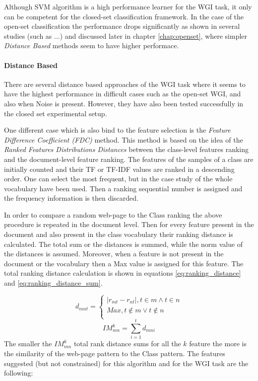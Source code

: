 Although SVM algorithm is a high performance learner for the WGI task, it only can be competent for the closed-set classification framework. In the case of the open-set classification the performance drops significantly as shown in several studies (such as ...) and discussed later in chapter \ref{chap:openset}, where simpler \textit{Distance Based} methods seem to have higher performace.

\paragraph{Distance Based} There are several distance based approaches of the WGI task where it seems to have the highest performance in difficult cases such as the open-set WGI, and also when Noise is present. However, they have also been tested successfully in the closed set experimental setup.

One different case which is also bind to the feature selection is the \textit{Feature Difference Coefficient (FDC)} method. This method is based on the idea of the \textit{Ranked Features Distributions Distances} between the class-level features ranking and the document-level feature ranking. The features of the samples of a class are initially counted and their TF or TF-IDF values are ranked in a descending order. One can select the most frequent, but in the case study of \parencite{waltinger2010feature} the whole vocabulary have been used. Then a ranking sequential number is assigned and the frequency information is then discarded.

In order to compare a random web-page to the Class ranking the above procedure is repeated in the document level. Then for every feature present in the document and also present in the class vocabulary their ranking distance is calculated. The total sum or the distances is summed, while the norm value of the distances is assumed. Moreover, when a feature is not present in the document or the vocabulary then a Max value is assigned for this feature. The total ranking distance calculation is shown in equations \ref{eq:ranking_distance} and \ref{eq:ranking_distance_sum}.

\begin{equation}\label{eq:ranking_distance}
	d_{mnt} =
      \begin{cases}
      	| r_{mt} - r_{nt} |, t \in m \wedge t \in n  \\
        Max, t \notin m \vee t \notin n \\ 
       \end{cases}
\end{equation}
\begin{equation}\label{eq:ranking_distance_sum}
	IM_{mn}^{k} = \sum_{i=1}^{t} d_{mni}
\end{equation}
The smaller the $IM^{k}_{mn}$ total rank distance sums for all the $k$ feature the more is the similarity of the web-page pattern to the Class pattern. The features suggested (but not constrained) for this algorithm and for the WGI task are the following:

